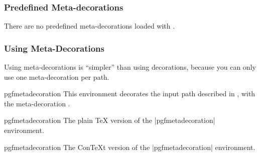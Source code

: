 \subsubsection{Predefined Meta-decorations}

There are no predefined meta-decorations loaded with \pgfname{}.


\subsubsection{Using Meta-Decorations}

Using meta-decorations is ``simpler'' than using decorations, because you can
only use one meta-decoration per path.

\begin{environment}{{pgfmetadecoration}}
    This environment decorates the input path described in , with the	meta-decoration .
\end{environment}

\begin{plainenvironment}{{pgfmetadecoration}}
    The plain \TeX{} version of the |{pgfmetadecoration}| environment.
\end{plainenvironment}

\begin{contextenvironment}{{pgfmetadecoration}}
    The Con\TeX t version of the |{pgfmetadecoration}| environment.
\end{contextenvironment}
